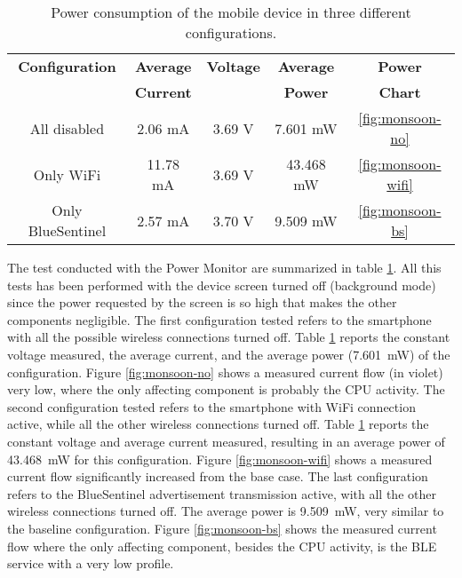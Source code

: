 \begin{table}[h!tb]
\center
\caption{Power consumption of the mobile device in three different configurations.}
\label{tab:monsoon}
\begin{tabular}{|c|c|c|c|c|}
  \hline
  \textbf{Configuration} & \textbf{Average} & \textbf{Voltage} & \textbf{Average} & \textbf{Power}\\
   & \textbf{Current} &  & \textbf{ Power} & \textbf{Chart}\\
  \hline
  All disabled & 2.06 mA & 3.69 V & 7.601 mW & \ref{fig:monsoon-no} \\
  Only WiFi & 11.78 mA & 3.69 V & 43.468 mW & \ref{fig:monsoon-wifi} \\
  Only BlueSentinel & 2.57 mA & 3.70 V & 9.509 mW & \ref{fig:monsoon-bs} \\
  \hline
\end{tabular}
\end{table}

The test conducted with the Power Monitor are summarized in table \ref{tab:monsoon}. All this tests has been performed with the device screen turned off (background mode) since the power requested by the screen is so high that makes the other components negligible. The first configuration tested refers to the smartphone with all the possible wireless connections turned off. Table \ref{tab:monsoon} reports the constant voltage measured, the average current, and the average power (7.601~mW) of the configuration. Figure \ref{fig:monsoon-no} shows a measured current flow (in violet) very low, where the only affecting component is probably the CPU activity.
The second configuration tested refers to the smartphone with WiFi connection active, while all the other wireless connections turned off. Table \ref{tab:monsoon} reports the constant voltage and average current measured, resulting in an average power of 43.468~mW for this configuration. Figure \ref{fig:monsoon-wifi} shows a measured current flow significantly increased from the base case. The last configuration refers to the BlueSentinel advertisement transmission active, with all the other wireless connections turned off. The average power is 9.509~mW, very similar to the baseline configuration. Figure \ref{fig:monsoon-bs} shows the measured current flow where the only affecting component, besides the CPU activity, is the BLE service with a very low profile.


